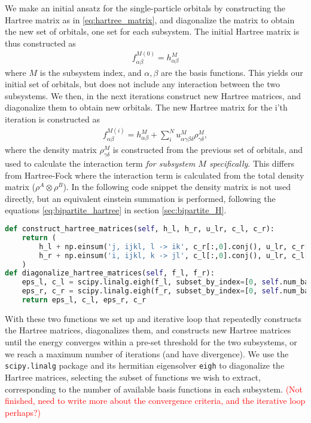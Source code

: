 \documentclass{subfiles}
\begin{document}
We make an initial ansatz for the single-particle orbitals by constructing the Hartree matrix as in \eqref{eq:hartree_matrix}, and diagonalize the matrix to obtain the new set of orbitals, one set for each subsystem. The initial Hartree matrix is thus constructed as
\begin{align*}
    f_{\alpha\beta}^{M(0)} = h_{\alpha\beta}^M
\end{align*}
where $M$ is the subsystem index, and $\alpha, \beta$ are the basis functions. This yields our initial set of orbitals, but does not include any interaction between the two subsystems. We then, in the next iterations construct new Hartree matrices, and diagonalize them to obtain new orbitals. The new Hartree matrix for the i'th iteration is constructed as
\begin{align*}
    f_{\alpha\beta}^{M(i)} = h_{\alpha\beta}^M + \sum_{i}^{N} u_{\alpha\gamma\beta\delta}^{M} \rho_{\gamma\delta}^{M},
\end{align*}
where the density matrix $\rho_{\gamma\delta}^{M}$ is constructed from the previous set of orbitals, and used to calculate the interaction term \emph{for subsystem $M$ specifically}. This differs from Hartree-Fock where the interaction term is calculated from the total density matrix ($\rho^A\otimes\rho^B$). In the following code snippet the density matrix is not used directly, but an equivalent einstein summation is performed, following the equations \eqref{eq:bipartite_hartree} in section \ref{sec:bipartite_H}.
\begin{lstlisting}[language=Python]
def construct_hartree_matrices(self, h_l, h_r, u_lr, c_l, c_r):
    return (
        h_l + np.einsum('j, ijkl, l -> ik', c_r[:,0].conj(), u_lr, c_r[:,0]),
        h_r + np.einsum('i, ijkl, k -> jl', c_l[:,0].conj(), u_lr, c_l[:,0]),
    )
def diagonalize_hartree_matrices(self, f_l, f_r):
    eps_l, c_l = scipy.linalg.eigh(f_l, subset_by_index=[0, self.num_basis_l - 1])
    eps_r, c_r = scipy.linalg.eigh(f_r, subset_by_index=[0, self.num_basis_r - 1])
    return eps_l, c_l, eps_r, c_r
\end{lstlisting}
With these two functions we set up and iterative loop that repeatedly constructs the Hartree matrices, diagonalizes them, and constructs new Hartree matrices until the energy converges within a pre-set threshold for the two subsystems, or we reach a maximum number of iterations (and have divergence). We use the \texttt{scipy.linalg}\cite{2020SciPy-NMeth} package and its hermitian eigensolver \texttt{eigh} to diagonalize the Hartree matrices, selecting the subset of functions we wish to extract, corresponding to the number of available basis functions in each subsystem. \textcolor{red}{(Not finished, need to write more about the convergence criteria, and the iterative loop perhaps?)}
\end{document}
